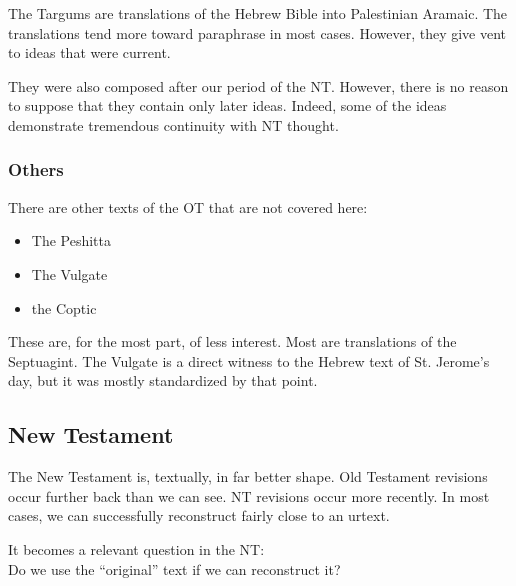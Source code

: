 \documentclass{beamer}
\begin{document}
\begin{frame}
  The Targums are translations of the Hebrew Bible into Palestinian Aramaic.
  The translations tend more toward paraphrase in most cases.
  However, they give vent to ideas that were current.
\end{frame}

\begin{frame}
  They were also composed after our period of the NT.
  However, there is no reason to suppose that they contain only later ideas.
  Indeed, some of the ideas demonstrate tremendous continuity with NT thought.
\end{frame}

\subsubsection{Others}

\begin{frame}
  There are other texts of the OT that are not covered here:\pause
  \begin{itemize}
	\item The Peshitta\pause
	\item The Vulgate\pause
	\item the Coptic
  \end{itemize}
\end{frame}

\begin{frame}
  These are, for the most part, of less interest.
  Most are translations of the Septuagint.
  The Vulgate is a direct witness to the Hebrew text of St. Jerome's day, but it was mostly standardized by that point.
\end{frame}

\subsection{New Testament}

\begin{frame}
  The New Testament is, textually, in far better shape.
  Old Testament revisions occur further back than we can see.
  NT revisions occur more recently.
  In most cases, we can successfully reconstruct fairly close to an urtext.
\end{frame}

\begin{frame}
  It becomes a relevant question in the NT:\\
  Do we use the ``original'' text if we can reconstruct it?
\end{frame}
\end{document}
